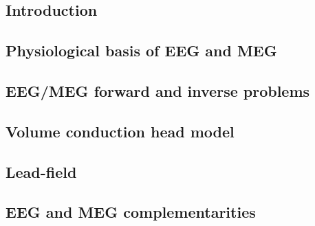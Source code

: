 \subsection{Introduction}


\subsection{Physiological basis of EEG and MEG}
\label{sec:Physiological_basis}


\subsection{EEG/MEG forward and inverse problems}
\label{sec:ForwardInverseProblem} 


\subsection{Volume conduction head model}


\subsection{Lead-field}
\label{sec:Leadfield}


\subsection{EEG and MEG complementarities}
\label{sec:EMEG_Complementarities}
